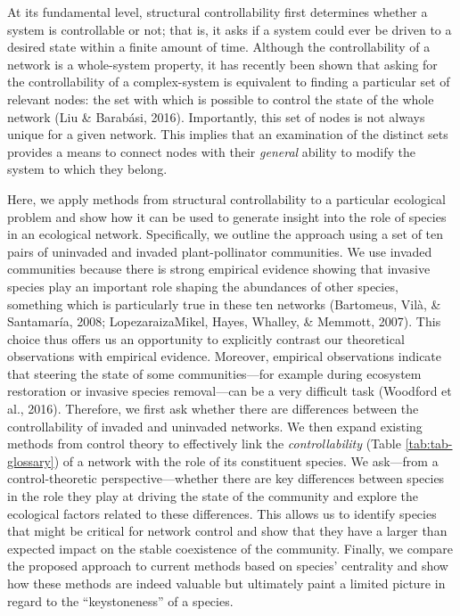 \documentclass[a4paper]{artikel1}
\newcommand{\R}[1]{\label{#1}\linelabel{#1}}
\theoremstyle{definition}
\theoremstyle{definition}
\theoremstyle{definition}
\theoremstyle{remark}
\begin{document}
At its fundamental level, structural controllability first determines
whether a system is controllable or not; that is, it asks if a system
could ever be driven to a desired state within a finite amount of time.
Although the controllability of a network is a whole-system property, it
has recently been shown that asking for the controllability of a
complex-system is equivalent to finding a particular set of relevant
nodes: the set with which is possible to control the state of the whole
network (Liu \& Barabási, 2016). Importantly, this set of nodes is not
always unique for a given network. This implies that an examination of
the distinct sets provides a means to connect nodes with their
\emph{general} ability to modify the system to which they belong.

Here, we apply methods from structural controllability to a particular
ecological problem and show how it can be used to generate insight into
the role of species in an ecological network. Specifically, we outline
the approach using a set of ten pairs of uninvaded and invaded
plant-pollinator communities. We use invaded communities because there
is strong empirical evidence showing that invasive species play an
important role shaping the abundances of other species, something which
is particularly true in these ten networks (Bartomeus, Vilà, \&
Santamaría, 2008; Lopezaraiza\textendash{}Mikel, Hayes, Whalley, \&
Memmott, 2007). This choice thus offers us an opportunity to explicitly
contrast our theoretical observations with empirical evidence. Moreover,
empirical observations indicate that steering the state of some
communities---for example during ecosystem restoration or invasive
species removal---can be a very difficult task (Woodford et al., 2016).
Therefore, we first ask whether there are differences between the
controllability of invaded and uninvaded networks. \R{R2-ref-glossary}
We then expand existing methods from control theory to effectively link
the \emph{controllability} (Table \ref{tab:tab-glossary}) of a network
with the role of its constituent species. We ask---from a
control-theoretic perspective---whether there are key differences
between species in the role they play at driving the state of the
community and explore the ecological factors related to these
differences. This allows us to identify species that might be critical
for network control and show that they have a larger than expected
impact on the stable coexistence of the community. Finally, we compare
the proposed approach to current methods based on species' centrality
and show how these methods are indeed valuable but ultimately paint a
limited picture in regard to the ``keystoneness'' of a species.
\end{document}
